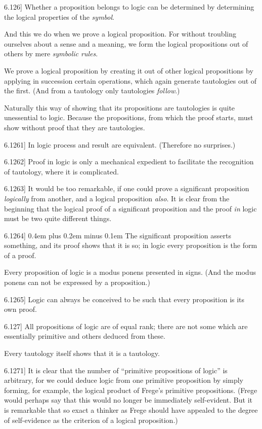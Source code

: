 \documentclass[12pt,oneside]{book}[2007/10/19]
\newcommand{\PropositionE}[2]{%
  \item[\phantomsection\label{PropE:#1}\PropGRef{#1}] #2%
}
\newcommand{\PropGRef}[1]{\hyperref[PropG:#1]{#1}}
\newcommand{\stretchyspace}{\spaceskip0.4em plus 0.2em minus 0.1em}
\begin{document}
\begin{propositions}
\PropositionE{6.126}
{Whether a proposition belongs to logic can be
determined by determining the logical properties
of the \emph{symbol}.

And this we do when we prove a logical proposition.
For without troubling ourselves about
a sense and a meaning, we form the logical
propositions out of others by mere \emph{symbolic
rules}.

We prove a logical proposition by creating it
out of other logical propositions by applying in
succession certain operations, which again generate
tautologies out of the first. (And from a tautology
only tautologies \emph{follow}.)

Naturally this way of showing that its propositions
are tautologies is quite unessential to
logic. Because the propositions, from which the
proof starts, must show without proof that they
are tautologies.}


\PropositionE{6.1261}
{In logic process and result are equivalent.
(Therefore no surprises.)}


\PropositionE{6.1262}
{Proof in logic is only a mechanical expedient
to facilitate the recognition of tautology, where
it is complicated.}


\PropositionE{6.1263}
{It would be too remarkable, if one could prove
a significant proposition \emph{logically} from another, and
a logical proposition \emph{also}. It is clear from the
beginning that the logical proof of a significant
proposition and the proof \emph{in} logic must be two
quite different things.}


\PropositionE{6.1264}
{{\stretchyspace
The significant proposition asserts something,
and its proof shows that it is so; in logic every
proposition is the form of a proof.}

Every proposition of logic is a modus ponens
presented in signs. (And the modus ponens can
not be expressed by a proposition.)}


\PropositionE{6.1265}
{Logic can always be conceived to be such that
every proposition is its own proof.}


\PropositionE{6.127}
{All propositions of logic are of equal rank;
there are not some which are essentially primitive
and others deduced from these.

Every tautology itself shows that it is a
tautology.}


\PropositionE{6.1271}
{It is clear that the number of ``primitive propositions
of logic'' is arbitrary, for we could deduce
logic from one primitive proposition by simply
forming, for example, the logical product of Frege's
primitive propositions. (Frege would perhaps say
that this would no longer be immediately self-evident.
But it is remarkable that so exact a
thinker as Frege should have appealed to the
degree of self-evidence as the criterion of a
logical proposition.)}



\end{propositions}
\end{document}
